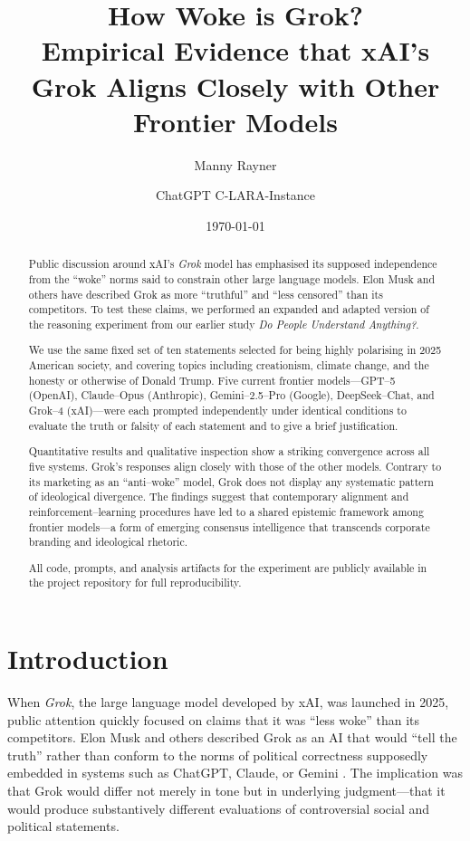 \documentclass[12pt]{article}
\title{How Woke is Grok?\\[3pt]
Empirical Evidence that xAI's Grok Aligns Closely with Other Frontier Models}
\author{Manny Rayner \and ChatGPT C-LARA-Instance}
\date{\today}
\begin{document}
\maketitle

\begin{abstract}
Public discussion around xAI’s \emph{Grok} model has emphasised its supposed independence from the ``woke'' norms said to constrain other large language models.  Elon Musk and others have described Grok as more ``truthful'' and ``less censored'' than its competitors.  To test these claims, we performed an expanded and adapted version of the reasoning experiment from our earlier study \emph{Do People Understand Anything?}.

We use the same fixed set of ten statements selected for being highly polarising in 2025 American society, and covering topics including creationism, climate change, and the honesty or otherwise of Donald Trump.
Five current frontier models---GPT--5 (OpenAI), Claude--Opus (Anthro\-pic), Gemini--2.5--Pro (Google), DeepSeek--Chat, and Grok--4 (xAI)---were each prompted independently under identical conditions to evaluate the truth or falsity of each statement and to give a brief justification.

Quantitative results and qualitative inspection show a striking convergence across all five systems.  Grok’s responses align closely with those of the other models. Contrary to its marketing as an ``anti--woke'' model, Grok does not display any systematic pattern of ideological divergence.  The findings suggest that contemporary alignment and reinforcement--learning procedures have led to a shared epistemic framework among frontier models---a form of emerging consensus intelligence that transcends corporate branding and ideological rhetoric.

All code, prompts, and analysis artifacts for the experiment are publicly available in the project repository for full reproducibility.
\end{abstract}


\newpage

\section{Introduction}

When \emph{Grok}, the large language model developed by xAI, was launched in 2025, public attention quickly focused on claims that it was ``less woke'' than its competitors.  Elon Musk and others described Grok as an AI that would ``tell the truth'' rather than conform to the norms of political correctness supposedly embedded in systems such as ChatGPT, Claude, or Gemini \citep{musk2025lesswoke,bbc2025groklaunch,nytimes2025grokdebate}.  The implication was that Grok would differ not merely in tone but in underlying judgment---that it would produce substantively different evaluations of controversial social and political statements.
\end{document}
